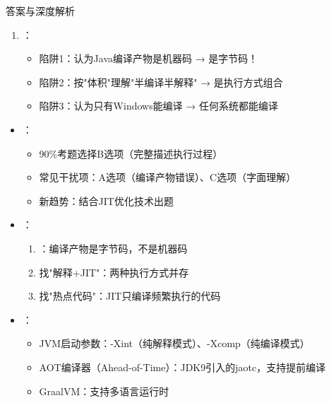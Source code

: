 \documentclass[12pt, a4paper]{ctexart}
\begin{document}
\begin{enumerate}[label=\textbf{\arabic*.}]
\begin{bluebox}{答案与深度解析}
\begin{enumerate}[leftmargin=*, nosep]
			      \item {}：
			            \begin{itemize}
				            \item 陷阱1：认为Java编译产物是机器码 → 是字节码！
				            \item 陷阱2：按"体积"理解"半编译半解释" → 是执行方式组合
				            \item 陷阱3：认为只有Windows能编译 → 任何系统都能编译
			            \end{itemize}
		      \end{enumerate}

		      \begin{itemize}[leftmargin=*, nosep]
			      \item {}：
			            \begin{itemize}
				            \item 90\%考题选择B选项（完整描述执行过程）
				            \item 常见干扰项：A选项（编译产物错误）、C选项（字面理解）
				            \item 新趋势：结合JIT优化技术出题
			            \end{itemize}

			      \item {}：
			            \begin{enumerate}
				            \item {}：编译产物是字节码，不是机器码
				            \item 找"解释+JIT"：两种执行方式并存
				            \item 找"热点代码"：JIT只编译频繁执行的代码
			            \end{enumerate}

			      \item {}：
			            \begin{itemize}
				            \item JVM启动参数：-Xint（纯解释模式）、-Xcomp（纯编译模式）
				            \item AOT编译器（Ahead-of-Time）：JDK9引入的jaotc，支持提前编译
				            \item GraalVM：支持多语言运行时
			            \end{itemize}
		      \end{itemize}
	      \end{bluebox}


\end{enumerate}
\end{document}
